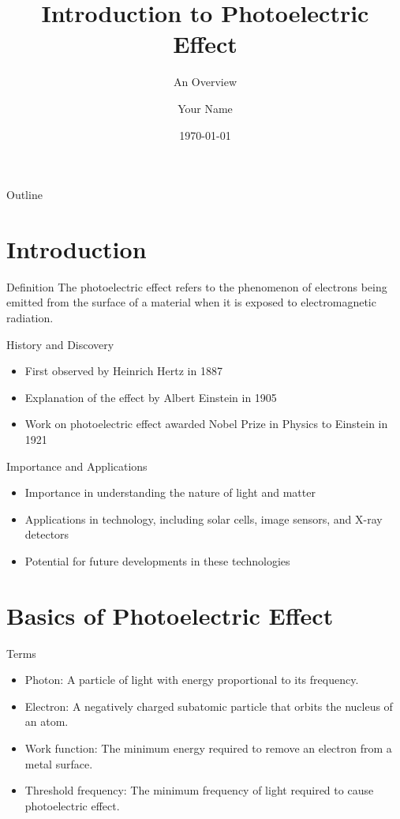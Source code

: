 \documentclass{beamer}
\title{Introduction to Photoelectric Effect}
\subtitle{An Overview}
\author{Your Name}
\institute{Your Institution}
\date{\today}
\begin{document}
\begin{frame}
  \titlepage
\end{frame}

\begin{frame}{Outline}
  \tableofcontents
\end{frame}

\section{Introduction}
\begin{frame}{Definition}
  The photoelectric effect refers to the phenomenon of electrons being emitted from the surface of a material when it is exposed to electromagnetic radiation.
\end{frame}

\begin{frame}{History and Discovery}
  \begin{itemize}
    \item First observed by Heinrich Hertz in 1887
    \item Explanation of the effect by Albert Einstein in 1905
    \item Work on photoelectric effect awarded Nobel Prize in Physics to Einstein in 1921
  \end{itemize}
\end{frame}

\begin{frame}{Importance and Applications}
  \begin{itemize}
    \item Importance in understanding the nature of light and matter
    \item Applications in technology, including solar cells, image sensors, and X-ray detectors
    \item Potential for future developments in these technologies
  \end{itemize}
\end{frame}

\section{Basics of Photoelectric Effect}
\begin{frame}{Terms}
  \begin{itemize}
    \item Photon: A particle of light with energy proportional to its frequency.
    \item Electron: A negatively charged subatomic particle that orbits the nucleus of an atom.
    \item Work function: The minimum energy required to remove an electron from a metal surface.
    \item Threshold frequency: The minimum frequency of light required to cause photoelectric effect.
  \end{itemize}
\end{frame}
\end{document}
